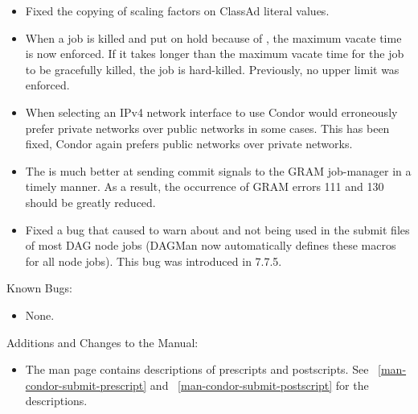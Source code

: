 \begin{itemize}
\item Fixed the copying of scaling factors on ClassAd literal values.

\item When a job is killed and put on hold because of
  , the maximum vacate time is now enforced.  If
  it takes longer than the maximum vacate time for the job to be
  gracefully killed, the job is hard-killed.  Previously, no upper
  limit was enforced.

\item When selecting an IPv4 network interface to use Condor would erroneously prefer private networks over public networks in some cases.  This has been fixed, Condor again prefers public networks over private networks.

\item The  is much better at sending commit signals
to the GRAM job-manager in a timely manner. As a result, the occurrence of
GRAM errors 111 and 130 should be greatly reduced.

\item Fixed a bug that caused  to warn about
 and  not being used in the
submit files of most DAG node jobs (DAGMan now automatically defines
these macros for all node jobs).  This bug was introduced in 7.7.5.

\end{itemize}

\noindent Known Bugs:

\begin{itemize}

\item None.

\end{itemize}

\noindent Additions and Changes to the Manual:

\begin{itemize}

\item The  man page contains descriptions of 
prescripts and postscripts.
See ~\ref{man-condor-submit-prescript} and ~\ref{man-condor-submit-postscript}
for the descriptions.

\end{itemize}

